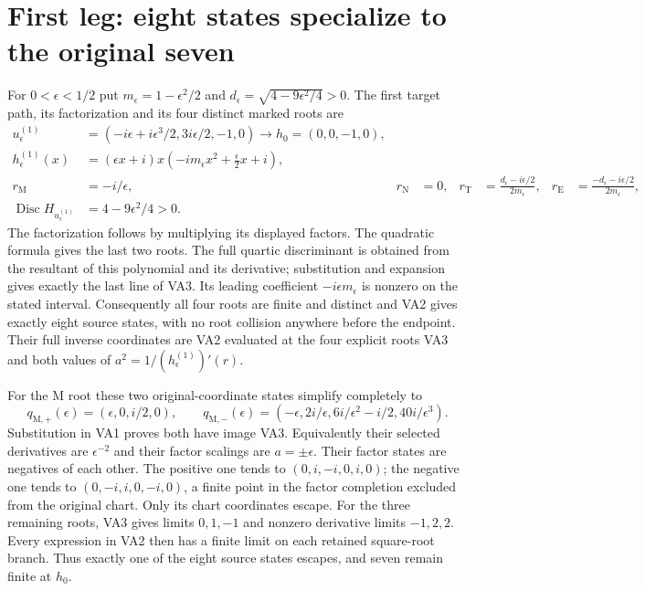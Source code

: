 \documentclass[11pt]{article}
\begin{document}
\section{First leg: eight states specialize to the original seven}
For $0<\epsilon<1/2$ put $m_\epsilon=1-\epsilon^2/2$ and
$d_\epsilon=\sqrt{4-9\epsilon^2/4}>0$. The first target path,
its factorization and its four distinct marked roots are
\begin{align}
 u^{(1)}_\epsilon
   &=(-i\epsilon+i\epsilon^3/2,3i\epsilon/2,-1,0)
                \longrightarrow h_0=(0,0,-1,0),\nonumber\\
 h^{(1)}_\epsilon(x)
   &=(\epsilon x+i)x
             \left(-im_\epsilon x^2+\frac\epsilon2 x+i\right),\nonumber\\
 r_{\mathrm M}&=-i/\epsilon,&r_{\mathrm N}&=0,&
 r_{\mathrm T}&=\frac{d_\epsilon-i\epsilon/2}{2m_\epsilon},&
 r_{\mathrm E}&=\frac{-d_\epsilon-i\epsilon/2}{2m_\epsilon},\nonumber\\
 \operatorname{Disc} H_{u^{(1)}_\epsilon}&=4-9\epsilon^2/4>0.
 &&\tag{VA3}
\end{align}
The factorization follows by multiplying its displayed factors.
The quadratic formula gives the last two roots. The full
quartic discriminant is obtained from the resultant of this
polynomial and its derivative; substitution and expansion
gives exactly the last line of VA3. Its leading coefficient
$-i\epsilon m_\epsilon$ is nonzero on the stated interval.
Consequently all four roots are finite and distinct and VA2
gives exactly eight source states, with no root collision
anywhere before the endpoint. Their full inverse coordinates
are VA2 evaluated at the four explicit roots VA3 and both
values of $a^2=1/(h^{(1)}_\epsilon)'(r)$.

For the M root these two original-coordinate states simplify
completely to
\[
 q_{\mathrm M,+}(\epsilon)=(\epsilon,0,i/2,0),\qquad
 q_{\mathrm M,-}(\epsilon)
 =(-\epsilon,2i/\epsilon,6i/\epsilon^2-i/2,40i/\epsilon^3).
\]
Substitution in VA1 proves both have image VA3. Equivalently
their selected derivatives are $\epsilon^{-2}$ and their
factor scalings are $a=\pm\epsilon$. Their factor states
are negatives of each other. The positive one tends to
$(0,i,-i,0,i,0)$; the negative one tends to
$(0,-i,i,0,-i,0)$, a finite point in the factor completion
excluded from the original chart. Only its chart coordinates
escape. For the three remaining roots, VA3 gives limits
$0,1,-1$ and nonzero derivative limits $-1,2,2$.
Every expression in VA2 then has a finite limit on each
retained square-root branch. Thus exactly one of the eight
source states escapes, and seven remain finite at $h_0$.
\end{document}
